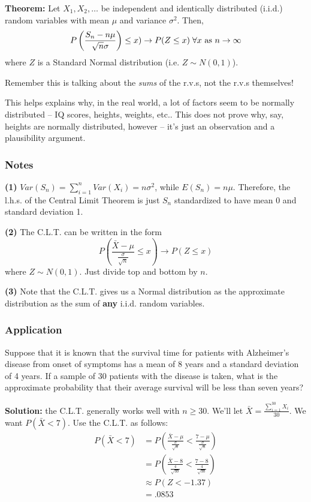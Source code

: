 \documentclass[12pt]{article}
\begin{document}
\textbf{Theorem:} Let $X_1, X_2, \dots$ be independent and identically distributed (i.i.d.) random variables with mean $\mu$ and variance $\sigma^2$. Then, 
\[
    P\left(\frac{S_n - n \mu}{\sqrt{n} \sigma}\right) \leq x) \rightarrow P(Z \leq x) \; \forall x \textnormal{ as } n \to \infty
\]
where $Z$ is a Standard Normal distribution (i.e. $Z \sim N(0,1)$). 

Remember this is talking about the \emph{sums} of the r.v.s, not the r.v.s themselves!

This helps explains why, in the real world, a lot of factors seem to be normally distributed -- IQ scores, heights, weights, etc.. This does not prove why, say, heights are normally distributed, however -- it's just an observation and a plausibility argument.

\subsubsection{Notes}
\textbf{(1)} $Var(S_n) = \sum_{i = 1}^n Var(X_i) = n \sigma^2$, while $E(S_n) = n \mu$. Therefore, the l.h.s. of the Central Limit Theorem is just $S_n$ standardized to have mean 0 and standard deviation 1.

\textbf{(2)} The C.L.T. can be written in the form
\[
    P\left(\frac{\bar{X} - \mu}{\frac{\sigma}{\sqrt{n}}} \leq x\right) \rightarrow P(Z \leq x)
\]
where $Z \sim N(0,1)$. Just divide top and bottom by $n$.

\textbf{(3)} Note that the C.L.T. gives us a Normal distribution as the approximate  distribution as the sum of \textbf{any} i.i.d. random variables. 

\subsubsection{Application}
Suppose that it is known that the survival time for patients with Alzheimer's disease from onset of symptoms has a mean of 8 years and a standard deviation of 4 years. If a sample of 30 patients with the disease is taken, what is the approximate probability that their average survival will be less than seven years?

\textbf{Solution:} the C.L.T. generally works well with $n \geq 30$. We'll let $\bar{X} = \frac{\sum_{i=1}^{30} X_i}{30}$. We want $P(\bar{X} < 7)$. Use the C.L.T. as follows:
\begin{align*}
    P(\bar{X} < 7) &= P\left(\frac{\bar{X} - \mu}{\frac{\sigma}{\sqrt{n}}} < \frac{7 - \mu}{\frac{\sigma}{\sqrt{n}}}\right) \\
        &= P\left(\frac{\bar{X} - 8}{\frac{4}{\sqrt{30}}} < \frac{7 - 8}{\frac{4}{\sqrt{30}}}\right) \\
        &\approx P(Z < -1.37) \\
        &= .0853
\end{align*}
\end{document}
